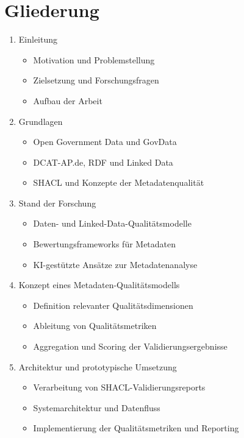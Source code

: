 \chapter{Gliederung}

\begin{enumerate}
    \item Einleitung
    \begin{itemize}
        \item Motivation und Problemstellung
        \item Zielsetzung und Forschungsfragen
        \item Aufbau der Arbeit
    \end{itemize}

    \item Grundlagen
    \begin{itemize}
        \item Open Government Data und GovData
        \item DCAT-AP.de, RDF und Linked Data
        \item SHACL und Konzepte der Metadatenqualität
    \end{itemize}

    \item Stand der Forschung
    \begin{itemize}
        \item Daten- und Linked-Data-Qualitätsmodelle
        \item Bewertungsframeworks für Metadaten
        \item KI-gestützte Ansätze zur Metadatenanalyse
    \end{itemize}

    \item Konzept eines Metadaten-Qualitätsmodells
    \begin{itemize}
        \item Definition relevanter Qualitätsdimensionen
        \item Ableitung von Qualitätsmetriken
        \item Aggregation und Scoring der Validierungsergebnisse
    \end{itemize}

    \item Architektur und prototypische Umsetzung
    \begin{itemize}
        \item Verarbeitung von SHACL-Validierungsreports
        \item Systemarchitektur und Datenfluss
        \item Implementierung der Qualitätsmetriken und Reporting
    \end{itemize}


\end{enumerate}
